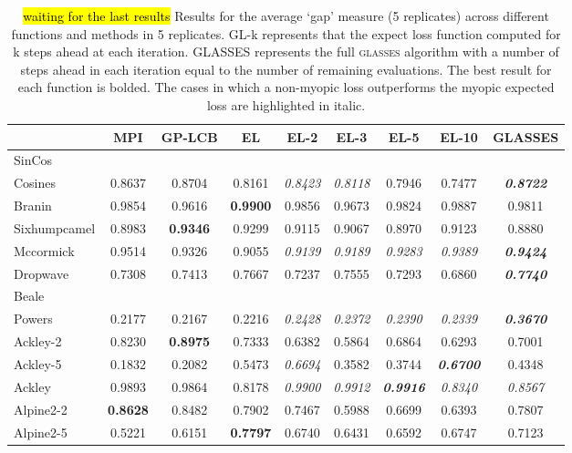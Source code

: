 \documentclass[twoside]{article}
\newcommand{\acr}[1]{\textsc{#1}\xspace}
\newcommand{\us}{\acr{glasses}}
\begin{document}
\begin{table}[t!]
\begin{center}
\begin{tabular}{l|ccc|cccc|c}
\toprule
{} &     MPI &     GP-LCB &      EL &    EL-2 &    EL-3 &    EL-5 &  EL-10 &    GLASSES \\
\midrule
SinCos &&& &&&&&\\ 
Cosines           &  0.8637 &  0.8704 &  0.8161 &  \emph{0.8423} &  \emph{0.8118} &  0.7946 &  0.7477 &  \emph{\textbf{0.8722}} \\
Branin              &  0.9854 &  0.9616 &  \textbf{0.9900} &  0.9856 &  0.9673 &  0.9824 &  0.9887 &  0.9811 \\
Sixhumpcamel        &  0.8983 &  \textbf{0.9346} &  0.9299 &  0.9115 &  0.9067 &  0.8970 &  0.9123 &  0.8880 \\
Mccormick           &  0.9514 &  0.9326 &  0.9055 &  \emph{0.9139} &  \emph{0.9189} &  \emph{0.9283} &  \emph{0.9389} &  \emph{\textbf{0.9424}} \\
Dropwave            &  0.7308 &  0.7413 &  0.7667 &  0.7237 &  0.7555 &  0.7293 &  0.6860 &  \emph{\textbf{0.7740}} \\
Beale &&& &&&&&\\ 
Powers              &  0.2177 &  0.2167 &  0.2216 &  \emph{0.2428} &  \emph{0.2372} &  \emph{0.2390} &  \emph{0.2339} &  \emph{\textbf{0.3670}} \\
Ackley-2 &  0.8230 &  \textbf{0.8975} &  0.7333 &  0.6382 &  0.5864 &  0.6864 &  0.6293 &  0.7001 \\
Ackley-5  & 0.1832&   0.2082&   0.5473&   \emph{0.6694}&  0.3582&   0.3744&   \emph{\textbf{0.6700}} &  0.4348\\ 
Ackley &  0.9893 &  0.9864 &  0.8178 &   \emph{0.9900} &   \emph{0.9912} &   \emph{\textbf{0.9916}} &   \emph{0.8340} &   \emph{0.8567} \\
Alpine2-2 &  \textbf{0.8628} &  0.8482 &  0.7902 &  0.7467 &  0.5988 &  0.6699 &  0.6393 &  0.7807 \\
Alpine2-5  &  0.5221 &  0.6151 &  \textbf{0.7797} &  0.6740 &  0.6431 &  0.6592 &  0.6747 &  0.7123 \\
\bottomrule
\end{tabular}\caption{\hl{waiting for the last results} Results for the average `gap' measure (5 replicates) across different functions and methods in 5 replicates.  GL-k represents that the expect loss function computed for k steps ahead at each iteration. GLASSES represents the full \us algorithm with a number of steps ahead in each iteration equal to the number of remaining evaluations. The best result for each function is bolded. The cases in which a non-myopic loss outperforms the myopic expected loss are highlighted in italic.}\label{table:comparision}
\end{center}
\end{table}
\end{document}
